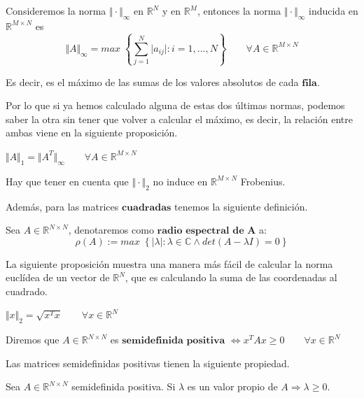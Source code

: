 \begin{nprop}
Consideremos la norma $\Vert \cdot \Vert _\infty$ en $\mathbb{R}^N$ y en $\mathbb{R}^M$, entonces la norma $\Vert \cdot \Vert _\infty$ inducida en $\mathbb{R}^{M \times N}$ es
\[ \Vert A \Vert _\infty = max \; \left\lbrace \sum_{j=1}^N \vert a_{ij} \vert : i = 1,...,N \right\rbrace \qquad \forall A \in \mathbb{R}^{M \times N} \]
\end{nprop}

Es decir, es el máximo de las sumas de los valores absolutos de cada $\textbf{fila}$.

Por lo que si ya hemos calculado alguna de estas dos últimas normas, podemos saber la otra sin tener que volver a calcular el máximo, es decir, la relación entre ambas viene en la siguiente proposición.

\begin{nprop}
$\Vert A \Vert _1 = \Vert A^T \Vert _\infty \qquad \forall A \in \mathbb{R}^{M \times N}$
\end{nprop}

Hay que tener en cuenta que $\Vert \cdot \Vert _2$ no induce en $\mathbb{R}^{M \times N}$ Frobenius.

Además, para las matrices $\textbf{cuadradas}$ tenemos la siguiente definición.

\begin{ndef}
Sea $A \in \mathbb{R}^{N \times N}$, denotaremos como $\textbf{radio espectral de A}$ a:
\[ \rho (A) := max \; \left\lbrace \vert \lambda \vert : \lambda \in \mathbb{C} \wedge det(A - \lambda I) = 0 \right\rbrace \]
\end{ndef}

La siguiente proposición muestra una manera más fácil de calcular la norma euclídea de un vector de $\mathbb{R}^N$, que es calculando la suma de las coordenadas al cuadrado.

\begin{nprop}
$\Vert x \Vert _2 = \sqrt{x^Tx} \qquad \forall x \in \mathbb{R}^N$
\end{nprop}

\begin{ndef}
Diremos que $A \in \mathbb{R}^{N \times N}$ es $\textbf{semidefinida positiva}$ $ \Leftrightarrow x^TAx \geq 0 \qquad \forall x \in \mathbb{R}^N $
\end{ndef}

Las matrices semidefinidas positivas tienen la siguiente propiedad.

\begin{nprop}
Sea $A \in \mathbb{R}^{N \times N}$ semidefinida positiva. Si $\lambda$ es un valor propio de $A \Rightarrow \lambda \geq 0$.
\end{nprop}

